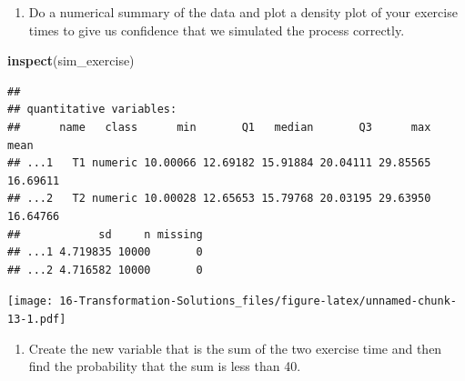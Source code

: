 \documentclass[
]{book}
\newenvironment{Shaded}{\begin{snugshade}}{\end{snugshade}}
\newcommand{\DataTypeTok}[1]{\textcolor[rgb]{0.13,0.29,0.53}{#1}}
\newcommand{\DecValTok}[1]{\textcolor[rgb]{0.00,0.00,0.81}{#1}}
\newcommand{\KeywordTok}[1]{\textcolor[rgb]{0.13,0.29,0.53}{\textbf{#1}}}
\newcommand{\NormalTok}[1]{#1}
\newcommand{\OperatorTok}[1]{\textcolor[rgb]{0.81,0.36,0.00}{\textbf{#1}}}
\newcommand{\StringTok}[1]{\textcolor[rgb]{0.31,0.60,0.02}{#1}}
\providecommand{\tightlist}{%
  \setlength{\itemsep}{0pt}\setlength{\parskip}{0pt}}
\begin{document}
\begin{enumerate}
\def\labelenumi{\alph{enumi}.}
\setcounter{enumi}{6}
\tightlist
\item
  Do a numerical summary of the data and plot a density plot of your exercise times to give us confidence that we simulated the process correctly.
\end{enumerate}

\begin{Shaded}
\begin{Highlighting}[]
\KeywordTok{inspect}\NormalTok{(sim_exercise)}
\end{Highlighting}
\end{Shaded}

\begin{verbatim}
## 
## quantitative variables:  
##      name   class      min       Q1   median       Q3      max     mean
## ...1   T1 numeric 10.00066 12.69182 15.91884 20.04111 29.85565 16.69611
## ...2   T2 numeric 10.00028 12.65653 15.79768 20.03195 29.63950 16.64766
##            sd     n missing
## ...1 4.719835 10000       0
## ...2 4.716582 10000       0
\end{verbatim}

\begin{Shaded}
\end{Shaded}

\texttt{[image: 16-Transformation-Solutions\_files/figure-latex/unnamed-chunk-13-1.pdf]}

\begin{enumerate}
\def\labelenumi{\alph{enumi}.}
\setcounter{enumi}{7}
\tightlist
\item
  Create the new variable that is the sum of the two exercise time and then find the probability that the sum is less than 40.
\end{enumerate}

\begin{Shaded}
\end{Shaded}
\end{document}
